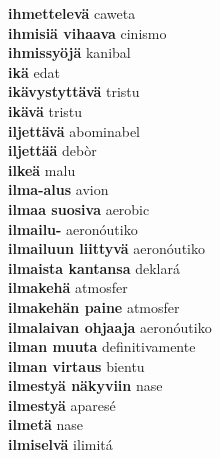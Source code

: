 \textbf{ ihmettelevä  } caweta \\
\textbf{ ihmisiä vihaava  } cinismo \\
\textbf{ ihmissyöjä  } kanibal \\
\textbf{ ikä  } edat \\
\textbf{ ikävystyttävä  } tristu \\
\textbf{ ikävä  } tristu \\
\textbf{ iljettävä  } abominabel \\
\textbf{ iljettää  } debòr \\
\textbf{ ilkeä  } malu \\
\textbf{ ilma-alus  } avion \\
\textbf{ ilmaa suosiva  } aerobic \\
\textbf{ ilmailu-  } aeronóutiko \\
\textbf{ ilmailuun liittyvä  } aeronóutiko \\
\textbf{ ilmaista kantansa  } deklará \\
\textbf{ ilmakehä  } atmosfer \\
\textbf{ ilmakehän paine  } atmosfer \\
\textbf{ ilmalaivan ohjaaja  } aeronóutiko \\
\textbf{ ilman muuta  } definitivamente \\
\textbf{ ilman virtaus  } bientu \\
\textbf{ ilmestyä näkyviin  } nase \\
\textbf{ ilmestyä  } aparesé \\
\textbf{ ilmetä  } nase \\
\textbf{ ilmiselvä  } ilimitá \\
